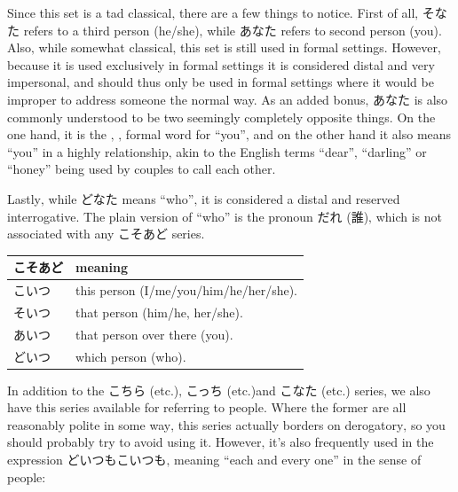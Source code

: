 \documentclass[11pt, b5paper, twoside, openright, onecolumn]{book}
\makeatletter
\newcommand*{\rubystack}[2]{{\relscale{0.5}%
  \begin{tabular}[b]{@{}c@{}}%
    {#1}\\%
   {\textscale{2}{#2}}%
  \end{tabular}}%
}
\DeclareRobustCommand*{\ruby}[2]{%
  \mbox{%
    \setlength{\parskip}{0ex}%
    \BeginAccSupp{method=pdfstringdef,ActualText={#1}}%
      \rubystack{\phantom{#2}}{#1}%
      \llap{%
        \rubystack{#2}{\phantom{#1}}%
      }%
    \EndAccSupp{}%
  }%
}
\renewcommand*{\ruby}[2]{#2 (#1)}%
\newenvironment{mytabularcentered}[1]{\noindent
\begin{center}\begin{tabular}[h]{#1}}{\end{tabular}\end{center}}
\makeatother
\begin{document}
Since this set is a tad classical‚ there are a few things to notice. First of all‚ そなた refers to a third person (he/she)‚ while あなた refers to second person (you). Also‚ while somewhat classical‚ this set is still used in formal settings. However‚ because it is used exclusively in formal settings it is considered distal and very impersonal‚ and should thus only be used in formal settings where it would be improper to address someone the normal way. As an added bonus‚ あなた is also commonly understood to be two seemingly completely opposite things. On the one hand‚ it is the ‚ ‚ formal word for “you”‚ and on the other hand it also means “you” in a highly  relationship‚ akin to the English terms “dear”‚ “darling” or “honey” being used by couples to call each other.

Lastly‚ while どなた means “who”‚ it is considered a distal and reserved interrogative. The plain version of “who” is the pronoun \ruby{誰}{だれ}‚ which is not associated with any こそあど series.

\vspace{0.5cm}
\smaller
\begin{center}
\begin{mytabularcentered}{| l  l |}\hline 
\rule{0pt}{2.4ex}こそあど & meaning\\ 
\hline
\rule{0pt}{2.4ex}\index[japanese]{こいつ}こいつ & \index[english]{This!person}this person (I/me/you/him/he/her/she).\\ 
\rule{0pt}{2.4ex}\index[japanese]{そいつ}そいつ & \index[english]{That!person}that person (him/he‚ her/she).\\ 
\rule{0pt}{2.4ex}\index[japanese]{あいつ}あいつ & that person over there (you).\\ 
\rule{0pt}{2.4ex}\index[japanese]{どいつ}どいつ & \index[english]{Which!person}which person (\index[english]{Who}who).\\ 
\hline 
\end{mytabularcentered}
\end{center}
\larger
\vspace{0.5cm}


In addition to the こちら (etc.)‚ こっち (etc.)and こなた (etc.) series‚ we also have this series available for referring to people. Where the former are all reasonably polite in some way‚ this series actually borders on derogatory‚ so you should probably try to avoid using it. However‚ it’s also frequently used in the expression どいつもこいつも‚ meaning “each and every one” in the sense of people:
\end{document}
